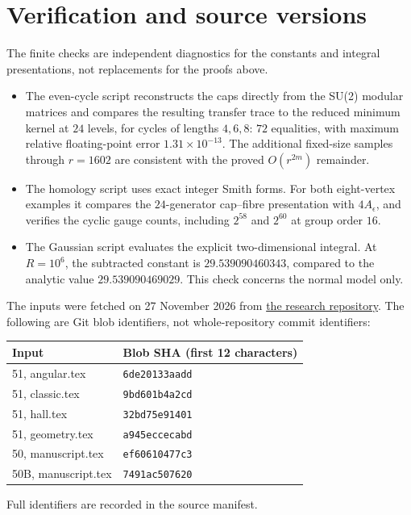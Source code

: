 \documentclass[11pt]{article}
\theoremstyle{remark}\newtheorem{remark}[theorem]{Remark}
\begin{document}
\section{Verification and source versions}
The finite checks are independent diagnostics for the constants and
integral presentations, not replacements for the proofs above.
\begin{itemize}
\item The even-cycle script reconstructs the caps directly from the
SU(2) modular matrices and compares the resulting transfer trace to
the reduced minimum kernel at $24$ levels, for cycles of lengths
$4,6,8$: $72$ equalities, with maximum relative floating-point error
$1.31\times10^{-13}$. The additional fixed-size samples through
$r=1602$ are consistent with the proved $O(r^{2m})$ remainder.
\item The homology script uses exact integer Smith forms. For both
eight-vertex examples it compares the $24$-generator cap--fibre
presentation with $4A_\epsilon$, and verifies the cyclic gauge
counts, including $2^{58}$ and $2^{60}$ at group order $16$.
\item The Gaussian script evaluates the explicit two-dimensional
integral. At $R=10^6$, the subtracted constant is
$29.539090460343$, compared to the analytic value
$29.539090469029$. This check concerns the normal model only.
\end{itemize}

The inputs were fetched on 27 November 2026 from
\href{https://github.com/g3173028019-beep/ai-automated-quantum-gravity-research}
{the research repository}. The following are Git blob identifiers,
not whole-repository commit identifiers:
\begin{center}\small
\begin{tabular}{ll}
\toprule
Input & Blob SHA (first 12 characters)\\\midrule
51, angular.tex & \texttt{6de20133aadd}\\
51, classic.tex & \texttt{9bd601b4a2cd}\\
51, hall.tex & \texttt{32bd75e91401}\\
51, geometry.tex & \texttt{a945eccecabd}\\
50, manuscript.tex & \texttt{ef60610477c3}\\
50B, manuscript.tex & \texttt{7491ac507620}\\\bottomrule
\end{tabular}
\end{center}
Full identifiers are recorded in the source manifest.
\end{document}
